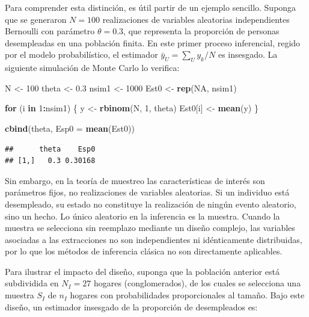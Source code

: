 \documentclass[
  spanish,
  12pt,
]{book}
\newenvironment{Shaded}{\begin{snugshade}}{\end{snugshade}}
\newcommand{\AttributeTok}[1]{\textcolor[rgb]{0.13,0.29,0.53}{#1}}
\newcommand{\ConstantTok}[1]{\textcolor[rgb]{0.56,0.35,0.01}{#1}}
\newcommand{\ControlFlowTok}[1]{\textcolor[rgb]{0.13,0.29,0.53}{\textbf{#1}}}
\newcommand{\DecValTok}[1]{\textcolor[rgb]{0.00,0.00,0.81}{#1}}
\newcommand{\FloatTok}[1]{\textcolor[rgb]{0.00,0.00,0.81}{#1}}
\newcommand{\FunctionTok}[1]{\textcolor[rgb]{0.13,0.29,0.53}{\textbf{#1}}}
\newcommand{\NormalTok}[1]{#1}
\newcommand{\OtherTok}[1]{\textcolor[rgb]{0.56,0.35,0.01}{#1}}
\newcommand{\SpecialCharTok}[1]{\textcolor[rgb]{0.81,0.36,0.00}{\textbf{#1}}}
\begin{document}
Para comprender esta distinción, es útil partir de un ejemplo sencillo. Suponga que se generaron \(N=100\) realizaciones de variables aleatorias independientes Bernoulli con parámetro \(\theta=0.3\), que representa la proporción de personas desempleadas en una población finita. En este primer proceso inferencial, regido por el modelo probabilístico, el estimador \(\bar{y}_U = \sum_U y_k / N\) es insesgado. La siguiente simulación de Monte Carlo lo verifica:

\begin{Shaded}
\begin{Highlighting}[]
\NormalTok{N     }\OtherTok{\textless{}{-}} \DecValTok{100}
\NormalTok{theta }\OtherTok{\textless{}{-}} \FloatTok{0.3}
\NormalTok{nsim1 }\OtherTok{\textless{}{-}} \DecValTok{1000}
\NormalTok{Est0  }\OtherTok{\textless{}{-}} \FunctionTok{rep}\NormalTok{(}\ConstantTok{NA}\NormalTok{, nsim1)}

\ControlFlowTok{for}\NormalTok{ (i }\ControlFlowTok{in} \DecValTok{1}\SpecialCharTok{:}\NormalTok{nsim1) \{}
\NormalTok{  y       }\OtherTok{\textless{}{-}} \FunctionTok{rbinom}\NormalTok{(N, }\DecValTok{1}\NormalTok{, theta)}
\NormalTok{  Est0[i] }\OtherTok{\textless{}{-}} \FunctionTok{mean}\NormalTok{(y)}
\NormalTok{\}}

\FunctionTok{cbind}\NormalTok{(theta, }\AttributeTok{Esp0 =} \FunctionTok{mean}\NormalTok{(Est0))}
\end{Highlighting}
\end{Shaded}

\begin{verbatim}
##      theta    Esp0
## [1,]   0.3 0.30168
\end{verbatim}

Sin embargo, en la teoría de muestreo las características de interés son parámetros fijos, no realizaciones de variables aleatorias. Si un individuo está desempleado, su estado no constituye la realización de ningún evento aleatorio, sino un hecho. Lo único aleatorio en la inferencia es la muestra. Cuando la muestra se selecciona sin reemplazo mediante un diseño complejo, las variables asociadas a las extracciones no son independientes ni idénticamente distribuidas, por lo que los métodos de inferencia clásica no son directamente aplicables.

Para ilustrar el impacto del diseño, suponga que la población anterior está subdividida en \(N_I = 27\) hogares (conglomerados), de los cuales se selecciona una muestra \(S_I\) de \(n_I\) hogares con probabilidades proporcionales al tamaño. Bajo este diseño, un estimador insesgado de la proporción de desempleados es:
\end{document}
